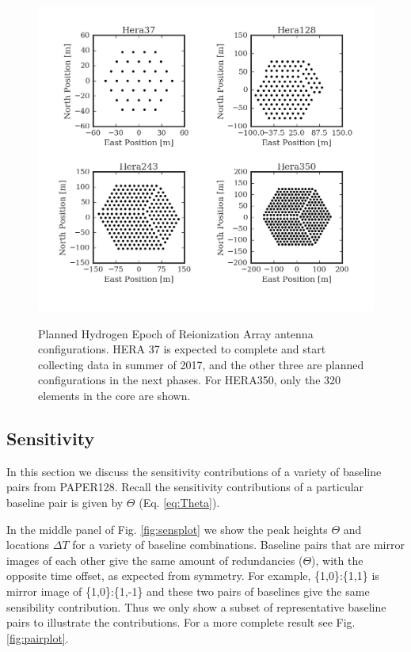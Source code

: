 \documentclass[twocolumn,apj,numberedappendix]{emulateapj}
\renewcommand\[{\begin{equation}}
\renewcommand\]{\end{equation}}
\begin{document}
\begin{figure}[h]
\includegraphics[width=\linewidth]{HeraAntpos}
\label{fig:HeraAntpos}
\caption{Planned Hydrogen Epoch of Reionization Array antenna configurations. HERA 37 is expected to complete and start collecting data in summer of 2017, and the other three are planned configurations in the next phases. For HERA350, only the 320 elements in the core are shown. }
\end{figure}

\subsection{ Sensitivity \label{sec:sensitivity}}
In this section we discuss the sensitivity contributions of a variety of baseline pairs from PAPER128.
Recall the sensitivity contributions of a particular baseline pair is given by $\Theta$ (Eq. \eqref{eq:Theta}). 


In the middle panel of Fig. \ref{fig:sensplot}
we show the peak heights $\Theta$ and locations $\Delta T$ for a variety of baseline combinations. Baseline pairs that are mirror images of each other 
give the same amount of redundancies ($\Theta$), with the opposite time offset, as expected from symmetry. 
For example, \{1,0\}:\{1,1\} is mirror image of \{1,0\}:\{1,-1\} and these two pairs of baselines
give the same sensibility contribution. Thus we only show a subset of representative baseline pairs to illustrate the contributions. For a more complete result see Fig. \ref{fig:pairplot}.  
\end{document}
